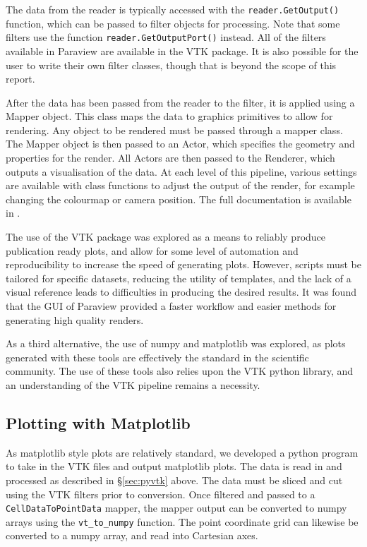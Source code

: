 \documentclass[preprint2]{aastex62}
\begin{document}
The data from the reader is typically accessed with the \verb|reader.GetOutput()| function, which can be passed to filter objects for processing. 
Note that some filters use the function \verb|reader.GetOutputPort()| instead.
All of the filters available in Paraview are available in the VTK package. 
It is also possible for the user to write their own filter classes, though that is beyond the scope of this report.

After the data has been passed from the reader to the filter, it is applied using a Mapper object. 
This class maps the data to graphics primitives to allow for rendering. Any object to be rendered must be passed through a mapper class.
The Mapper object is then passed to an Actor, which specifies the geometry and properties for the render. 
All Actors are then passed to the Renderer, which outputs a visualisation of the data. At each level of this pipeline, various settings are available with class functions to adjust the output of the render, for example changing the colourmap or camera position. The full documentation is available in \cite{avila2010vtk}.

The use of the VTK package was explored as a means to reliably produce publication ready plots, and allow for some level of automation and reproducibility to increase the speed of generating plots.
However, scripts must be tailored for specific datasets, reducing the utility of templates, and the lack of a visual reference leads to difficulties in producing the desired results. 
It was found that the GUI of Paraview provided a faster workflow and easier methods for generating high quality renders.

As a third alternative, the use of numpy and matplotlib was explored, as plots generated with these tools are effectively the standard in the scientific community. 
The use of these tools also relies upon the VTK python library, and an understanding of the VTK pipeline remains a necessity.

\subsection{Plotting with Matplotlib}
As matplotlib style plots are relatively standard, we developed a python program to take in the VTK files and output matplotlib plots.
The data is read in and processed as described in \S \ref{sec:pyvtk} above. 
The data must be sliced and cut using the VTK filters prior to conversion.
Once filtered and passed to a \verb|CellDataToPointData| mapper, the mapper output can be converted to numpy arrays using the \verb|vt_to_numpy| function.
The point coordinate grid can likewise be converted to a numpy array, and read into Cartesian axes. 
\end{document}
